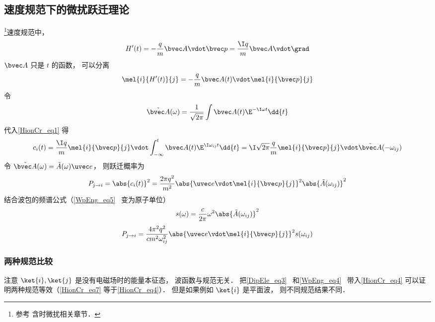 \subsection{速度规范下的微扰跃迁理论}
\footnote{参考\cite{Merzbacher} 含时微扰相关章节．}速度规范中，
\begin{equation}
H'(t) = -\frac{q}{m}\bvec A \vdot \bvec p = \frac{\I q}{m}\bvec A \vdot \grad
\end{equation}
$\bvec A$ 只是 $t$ 的函数， 可以分离
\begin{equation}
\mel{i}{H'(t)}{j} = -\frac{q}{m}\bvec A(t) \vdot \mel{i}{\bvec p}{j}
\end{equation}
令
\begin{equation}
\tilde {\bvec A}(\omega) = \frac{1}{\sqrt{2\pi}} \int \bvec A(t) \E^{-\I\omega t} \dd{t}
\end{equation}
代入\autoref{HionCr_eq1} 得
\begin{equation}\label{HionCr_eq4}
c_i(t) = \frac{\I q}{m} \mel{i}{\bvec p}{j} \vdot \int_{-\infty}^t  \bvec A(t) \E^{\I\omega_{ij} t} \dd{t} = \I\sqrt{2\pi}\frac{q}{m} \mel{i}{\bvec p}{j} \vdot \tilde {\bvec A}(-\omega_{ij})
\end{equation}
令 $\tilde {\bvec A}(\omega) = \tilde {A}(\omega)\uvec e$， 则跃迁概率为
\begin{equation}\label{HionCr_eq3}
P_{j\to i} = \abs{c_i(t)}^2 = \frac{2\pi q^2}{m^2} \abs{\uvec e \vdot\mel{i}{\bvec p}{j}}^2 \abs{\tilde {A}(\omega_{ij})}^2
\end{equation}
结合波包的频谱公式（\autoref{WpEng_eq5}~ 变为原子单位）
\begin{equation}
s(\omega) = \frac{c}{2\pi} \omega^2 \abs{\tilde {A}(\omega_{ij})}^2
\end{equation}
\begin{equation}\label{HionCr_eq5}
P_{j\to i} = \frac{4\pi^2 q^2}{c m^2 \omega_{ij}^2} \abs{\uvec e \vdot\mel{i}{\bvec p}{j}}^2 s(\omega_{ij})
\end{equation}

\subsubsection{两种规范比较}
注意 $\ket{i}, \ket{j}$ 是没有电磁场时的能量本征态， 波函数与规范无关． 把\autoref{DipEle_eq3}~ 和\autoref{WpEng_eq4}~ 带入\autoref{HionCr_eq4} 可以证明两种规范等效（\autoref{HionCr_eq7}  等于\autoref{HionCr_eq4}）． 但是如果例如 $\ket{i}$ 是平面波， 则不同规范结果不同．

